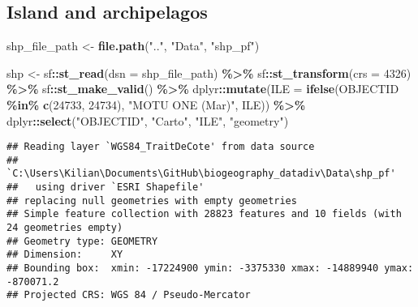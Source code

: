 \documentclass[
]{article}
\newenvironment{Shaded}{\begin{snugshade}}{\end{snugshade}}
\newcommand{\AttributeTok}[1]{\textcolor[rgb]{0.13,0.29,0.53}{#1}}
\newcommand{\DecValTok}[1]{\textcolor[rgb]{0.00,0.00,0.81}{#1}}
\newcommand{\FunctionTok}[1]{\textcolor[rgb]{0.13,0.29,0.53}{\textbf{#1}}}
\newcommand{\NormalTok}[1]{#1}
\newcommand{\OtherTok}[1]{\textcolor[rgb]{0.56,0.35,0.01}{#1}}
\newcommand{\SpecialCharTok}[1]{\textcolor[rgb]{0.81,0.36,0.00}{\textbf{#1}}}
\newcommand{\StringTok}[1]{\textcolor[rgb]{0.31,0.60,0.02}{#1}}
\begin{document}
\hypertarget{island-and-archipelagos}{%
\subsection{Island and archipelagos}\label{island-and-archipelagos}}

\begin{Shaded}
\begin{Highlighting}[]
\NormalTok{shp\_file\_path }\OtherTok{\textless{}{-}} \FunctionTok{file.path}\NormalTok{(}\StringTok{".."}\NormalTok{, }\StringTok{"Data"}\NormalTok{, }\StringTok{"shp\_pf"}\NormalTok{)}
\end{Highlighting}
\end{Shaded}

\begin{Shaded}
\begin{Highlighting}[]
\NormalTok{shp }\OtherTok{\textless{}{-}}\NormalTok{ sf}\SpecialCharTok{::}\FunctionTok{st\_read}\NormalTok{(}\AttributeTok{dsn =}\NormalTok{ shp\_file\_path) }\SpecialCharTok{\%\textgreater{}\%}
\NormalTok{  sf}\SpecialCharTok{::}\FunctionTok{st\_transform}\NormalTok{(}\AttributeTok{crs =} \DecValTok{4326}\NormalTok{) }\SpecialCharTok{\%\textgreater{}\%}
\NormalTok{  sf}\SpecialCharTok{::}\FunctionTok{st\_make\_valid}\NormalTok{() }\SpecialCharTok{\%\textgreater{}\%} 
\NormalTok{  dplyr}\SpecialCharTok{::}\FunctionTok{mutate}\NormalTok{(}\AttributeTok{ILE =} \FunctionTok{ifelse}\NormalTok{(OBJECTID }\SpecialCharTok{\%in\%} \FunctionTok{c}\NormalTok{(}\DecValTok{24733}\NormalTok{, }\DecValTok{24734}\NormalTok{), }\StringTok{"MOTU ONE (Mar)"}\NormalTok{, ILE)) }\SpecialCharTok{\%\textgreater{}\%}
\NormalTok{  dplyr}\SpecialCharTok{::}\FunctionTok{select}\NormalTok{(}\StringTok{"OBJECTID"}\NormalTok{, }\StringTok{"Carto"}\NormalTok{, }\StringTok{"ILE"}\NormalTok{, }\StringTok{"geometry"}\NormalTok{)}
\end{Highlighting}
\end{Shaded}

\begin{verbatim}
## Reading layer `WGS84_TraitDeCote' from data source 
##   `C:\Users\Kilian\Documents\GitHub\biogeography_datadiv\Data\shp_pf' 
##   using driver `ESRI Shapefile'
## replacing null geometries with empty geometries
## Simple feature collection with 28823 features and 10 fields (with 24 geometries empty)
## Geometry type: GEOMETRY
## Dimension:     XY
## Bounding box:  xmin: -17224900 ymin: -3375330 xmax: -14889940 ymax: -870071.2
## Projected CRS: WGS 84 / Pseudo-Mercator
\end{verbatim}
\end{document}
